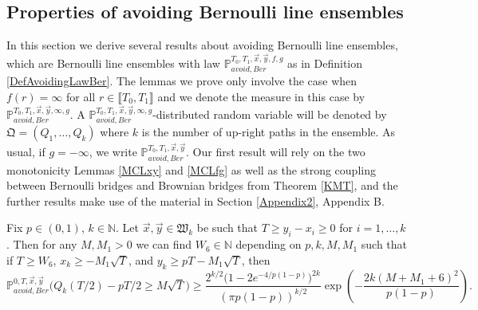 \subsection{Properties of avoiding Bernoulli line ensembles}\label{Section3.3}  In this section we derive several results about avoiding Bernoulli line ensembles, which are Bernoulli line ensembles with law $\mathbb{P}_{avoid, Ber}^{T_0,T_1, \vec{x}, \vec{y}, f, g}$ as in Definition \ref{DefAvoidingLawBer}. The lemmas we prove only involve the case when $f(r) = \infty$ for all $r \in \llbracket T_0, T_1 \rrbracket$ and we denote the measure in this case by $\mathbb{P}_{avoid, Ber}^{T_0,T_1, \vec{x}, \vec{y}, \infty, g}$. A $\mathbb{P}_{avoid, Ber}^{T_0,T_1, \vec{x}, \vec{y}, \infty, g}$-distributed random variable will be denoted by $\mathfrak{Q} = (Q_1, \dots, Q_k)$ where $k$ is the number of up-right paths in the ensemble. As usual, if $g=-\infty$, we write $\mathbb{P}_{avoid, Ber}^{T_0,T_1, \vec{x}, \vec{y}}$. Our first result will rely on the two monotonicity Lemmas \ref{MCLxy} and \ref{MCLfg} as well as the strong coupling between Bernoulli bridges and Brownian bridges from Theorem \ref{KMT}, and the further results make use of the material in Section \ref{Appendix2}, Appendix B.


\begin{lemma}\label{prob19}
	Fix $p\in(0,1)$, $k\in\mathbb{N}$. Let $\vec{x},\vec{y}\in\mathfrak{W}_k$ be such that $T \geq y_i - x_i \geq 0$ for $i=1,\dots,k$. Then for any $M,M_1 > 0$ we can find $W_6\in\mathbb{N}$ depending on $p,k,M,M_1$ such that if $T\geq W_6$, $x_k \geq - M_1\sqrt{T}$, and $y_k \geq pT - M_1\sqrt{T}$, then
	\begin{equation}\label{19ineq}
	\mathbb{P}^{0,T,\vec{x},\vec{y}}_{avoid, Ber}\Big(Q_k(T/2) - pT/2 \geq M\sqrt{T}\Big) \geq \frac{2^{k/2}\big(1-2e^{-4/p(1-p)}\big)^{2k}}{(\pi p(1-p))^{k/2}}\exp\left(-\frac{2k(M+M_1+6)^2}{p(1-p)}\right).
	\end{equation}
\end{lemma}


